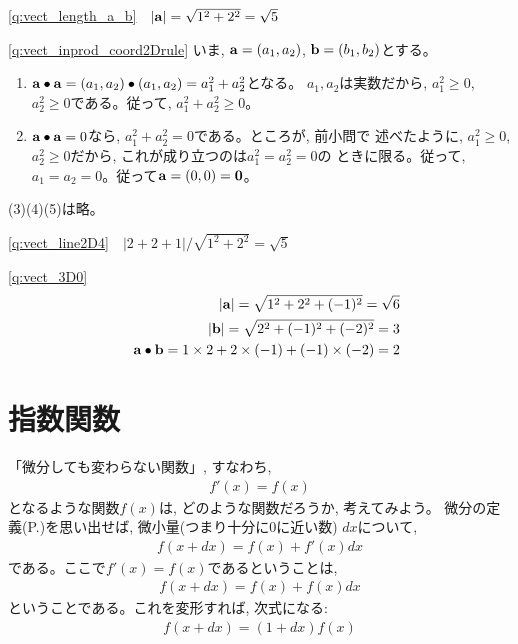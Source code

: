\ref{q:vect_length_a_b}　$|{\bf a}|=\sqrt{1^2+2^2}=\sqrt{5}$
\mv

\ref{q:vect_inprod_coord2Drule} いま, ${\bf a}=(a_1, a_2)$, 
${\bf b}=(b_1, b_2)$とする。
\begin{enumerate}
\item ${\bf a}\bullet{\bf a}=(a_1, a_2)\bullet(a_1, a_2)=a_1^2+a_2^2$となる。
$a_1, a_2$は実数だから, $a_1^2\geq0$, $a_2^2\geq0$である。従って, $a_1^2+a_2^2\geq0$。
\item ${\bf a}\bullet{\bf a}=0$なら, $a_1^2+a_2^2=0$である。ところが, 前小問で
述べたように, $a_1^2\geq0$, $a_2^2\geq0$だから, これが成り立つのは$a_1^2=a_2^2=0$の
ときに限る。従って, $a_1=a_2=0$。従って${\bf a}=(0, 0)={\bf 0}$。
\end{enumerate}
(3)(4)(5)は略。
\mv

\ref{q:vect_line2D4}　$|2+2+1|/\sqrt{1^2+2^2}=\sqrt{5}$
\mv


\ref{q:vect_3D0} 
\begin{eqnarray*}
&&|{\bf a}|=\sqrt{1^2+2^2+(-1)^2}=\sqrt{6}\\
&&|{\bf b}|=\sqrt{2^2+(-1)^2+(-2)^2}=3\\
&&{\bf a}\bullet{\bf b}=1\times2+2\times(-1)+(-1)\times(-2)=2
\end{eqnarray*}
\mv




\section{指数関数}

「微分しても変わらない関数」, すなわち, 
\begin{eqnarray}
f'(x)=f(x)\label{eq:exp_start}
\end{eqnarray}
となるような関数$f(x)$は, どのような関数だろうか, 考えてみよう。
微分の定義(P.\pageref{sect_def_differential})を思い出せば, 
微小量(つまり十分に0に近い数) $dx$について, 
\begin{eqnarray}f(x+dx) = f(x) + f'(x) dx\end{eqnarray}
である。ここで$f'(x)=f(x)$であるということは, 
\begin{eqnarray}f(x+dx) = f(x) + f(x) dx\end{eqnarray}
ということである。これを変形すれば, 次式になる:
\begin{eqnarray}
f(x+dx)= (1+dx) f(x)
\end{eqnarray}

